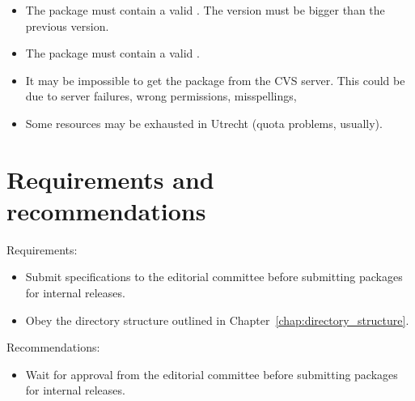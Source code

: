 {\begin{itemize}
\item The package must contain a valid .
      The version must be bigger than the previous version.

\item The package must contain a valid .

\item It may be impossible to get the package from the CVS server. 
      This could be due to server failures, wrong permissions, misspellings,
      \etc

\item Some resources may be exhausted in Utrecht (quota problems, usually).

\end{itemize}


\section{Requirements and recommendations}
\label{sec:submission_req_and_rec}

\noindent
Requirements:
\begin{itemize}
   \item Submit specifications to the editorial committee before submitting
         packages for internal releases.
   \item Obey the directory structure outlined in Chapter~\ref{chap:directory_structure}.
\end{itemize}

\noindent
Recommendations:
\begin{itemize}
    \item Wait for approval from the editorial committee before submitting packages
          for internal releases.
\end{itemize}
}


